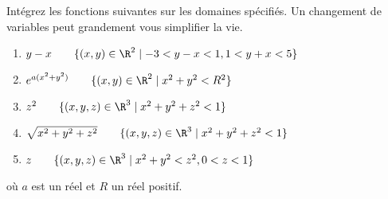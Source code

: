 
\begin{exercice}\label{exoIntMult0002}

Intégrez les fonctions suivantes sur les domaines spécifiés. Un changement de variables peut grandement vous simplifier la vie.
\begin{enumerate}
\item $ y-x \qquad \{(x,y)\in \R^2 \mid -3<y - x<1, 1<y +x <5 \} $
\item $ e^{a(x^2+y^2)} \qquad \{(x,y)\in \R^2 \mid x^2+y^2 <R^2 \} $
\item $ z^2 \qquad \{(x,y,z)\in \R^3 \mid x^2+y^2+z^2 <1 \} $
\item $ \sqrt{x^2+y^2+z^2} \qquad \{(x,y,z)\in \R^3 \mid x^2+y^2+z^2 <1 \}$
\item $ z \qquad \{(x,y,z)\in \R^3 \mid x^2 + y^2 < z^2, 0<z<1 \} $
\end{enumerate}
où $a$ est un réel et $R$ un réel positif.

\end{exercice}
